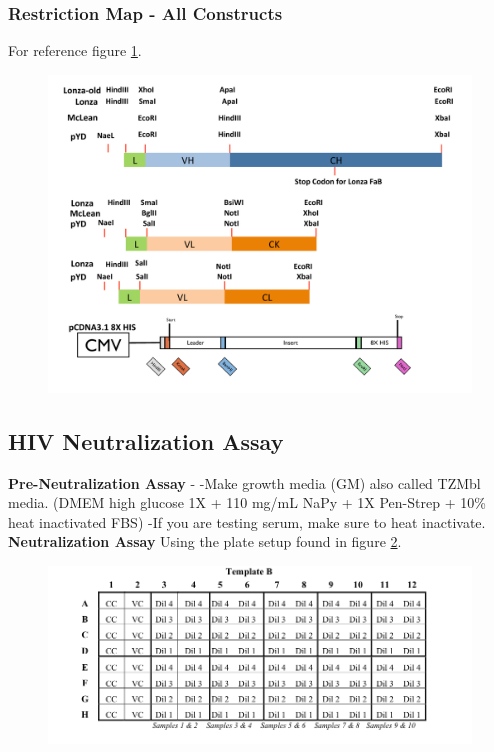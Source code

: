 \subsubsection{Restriction Map - All Constructs}
For reference figure \ref{fig:figa_1}.

\begin{figure}
   \centering
   \includegraphics[scale=.85]{images/appendix/figa1.pdf}
   \caption[Restriction Maps for Common Vectors]{}
       \label{fig:figa_1}
\end{figure}

\clearpage

\subsection{HIV Neutralization Assay}
\textbf{Pre-Neutralization Assay} -
-Make growth media (GM) also called TZMbl media. (DMEM high glucose 1X + 110 mg/mL NaPy + 1X Pen-Strep +  10\% heat inactivated FBS)
-If you are testing serum, make sure to heat inactivate. \\

\textbf{Neutralization Assay}
Using the plate setup found in figure \ref{fig:figa_2}.
\begin{figure}[!t]
   \centering
   \includegraphics[]{images/appendix/figa2.png}
   \caption[Neutralization Assay Plate Setup]{}
       \label{fig:figa_2}
\end{figure}

